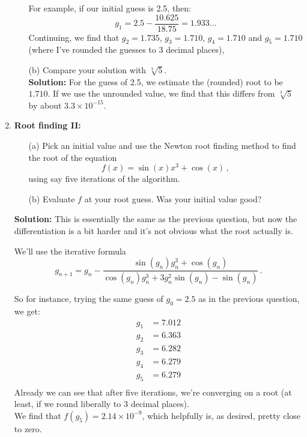 \documentclass[11pt,a4paper]{scrartcl}
\begin{document}
\begin{enumerate}
\begin{enumerate}
    For example, if our initial guess is 2.5, then:
    \[
    g_1 = 2.5 - \frac{10.625}{18.75} = 1.933\dots
    \]
    Continuing, we find that $g_2 = 1.735$, $g_3 = 1.710$, $g_4 = 1.710$ and $g_5 = 1.710$ (where I've rounded the guesses to 3 decimal places),
        
    \item[(b)] Compare your solution with $\sqrt[3]{5}$.\\
    \textbf{Solution: } For the guess of 2.5, we estimate the (rounded) root to be $1.710$. If we use the unrounded value, we find that this differs from $\sqrt[3]{5}$ by about $3.3\times 10^{-15}$. 
\end{enumerate}

\item {\textbf{Root finding II: }}
\begin{enumerate}
    \item[(a)] Pick an initial value and use the Newton root finding method to find the root of the equation 
    \[
    f(x) = \sin(x)x^3 + \cos(x)\,,
    \]
    using say five iterations of the algorithm.
    \item[(b)] Evaluate $f$ at your root guess. Was your initial value good?
\end{enumerate}
\textbf{Solution: } This is essentially the same as the previous question, but now the differentiation is a bit harder and it's not obvious what the root actually is. 

We'll use the iterative formula
    \[
    g_{n+1} = g_n - \frac{\sin(g_n)g_n^3+\cos(g_n)}{\cos(g_n)g_n^3+3g_n^2\sin(g_n) -\sin(g_n) }\,. 
    \]

So for instance, trying the same guess of $g_0=2.5$ as in the previous question, we get: 
\begin{align*}
g_1 &= 7.012\\
g_2 &= 6.363\\
g_3 &= 6.282\\
g_4 &= 6.279\\
g_5 &= 6.279\\
\end{align*}
Already we can see that after five iterations, we're converging on a root (at least, if we round liberally to 3 decimal places). \\
We find that $f(g_5) = 2.14\times 10^{-9}$, which helpfully is, as desired, pretty close to zero. 


\end{enumerate}
\end{document}
